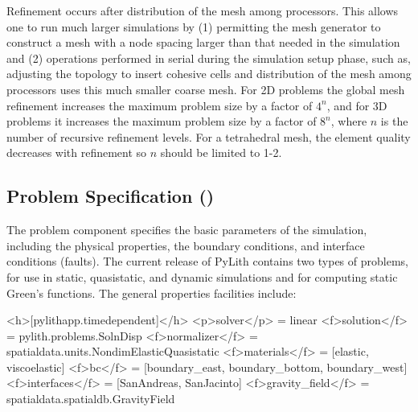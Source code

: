 Refinement occurs after distribution of the mesh among processors.
This allows one to run much larger simulations by (1) permitting the
mesh generator to construct a mesh with a node spacing larger than
that needed in the simulation and (2) operations performed in serial
during the simulation setup phase, such as, adjusting the topology
to insert cohesive cells and distribution of the mesh among processors
uses this much smaller coarse mesh. For 2D problems the global mesh
refinement increases the maximum problem size by a factor of $4^{n}$,
and for 3D problems it increases the maximum problem size by a factor
of $8^{n}$, where $n$ is the number of recursive refinement levels.
For a tetrahedral mesh, the element quality decreases with refinement
so $n$ should be limited to 1-2.


\subsection{Problem Specification (\protect{})}

The problem component specifies the basic parameters of the simulation,
including the physical properties, the boundary conditions, and interface
conditions (faults). The current release of PyLith contains two types
of problems,  for use in static, quasistatic,
and dynamic simulations and  for computing static
Green's functions. The general properties facilities include:
\begin{inventory}
\end{inventory}

\begin{cfg}
<h>[pylithapp.timedependent]</h>
<p>solver</p> = linear
<f>solution</f> = pylith.problems.SolnDisp
<f>normalizer</f> = spatialdata.units.NondimElasticQuasistatic
<f>materials</f> = [elastic, viscoelastic]
<f>bc</f> = [boundary_east, boundary_bottom, boundary_west]
<f>interfaces</f> = [SanAndreas, SanJacinto]
<f>gravity_field</f> = spatialdata.spatialdb.GravityField
\end{cfg}

